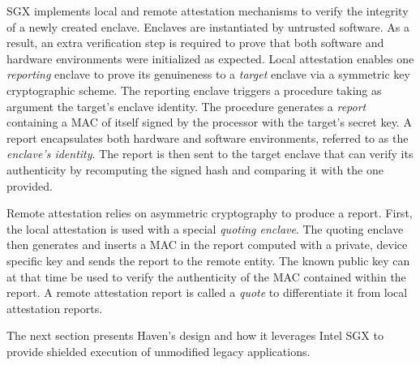 SGX implements local and remote attestation mechanisms to verify the integrity of a newly created enclave.
Enclaves are instantiated by untrusted software.
As a result, an extra verification step is required to prove that both software and hardware environments were initialized as expected.
Local attestation enables one \emph{reporting} enclave to prove its genuineness to a \emph{target} enclave via a symmetric key cryptographic scheme.
The reporting enclave triggers a procedure taking as argument the target's enclave identity.
The procedure generates a \emph{report} containing a MAC of itself signed by the processor with the target's secret key.
A report encapsulates both hardware and software environments, referred to as the \emph{enclave's identity}.
The report is then sent to the target enclave that can verify its authenticity by recomputing the signed hash and comparing it with the one provided.

Remote attestation relies on asymmetric cryptography to produce a report.
First, the local attestation is used with a special \emph{quoting enclave}.
The quoting enclave then generates and inserts a MAC in the report computed with a private, device specific key and sends the report to the remote entity.
The known public key can at that time be used to verify the authenticity of the MAC contained within the report.
A remote attestation report is called a \emph{quote} to differentiate it from local attestation reports.

The next section presents Haven's design and how it leverages Intel SGX to provide shielded execution of unmodified legacy applications.